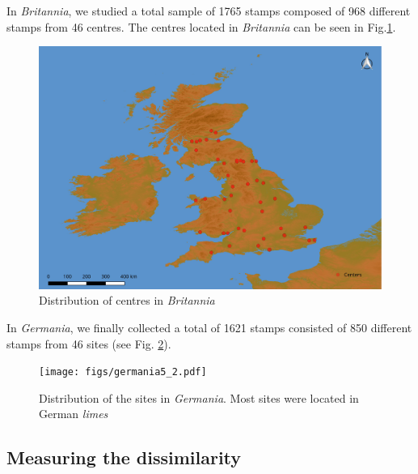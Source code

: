\documentclass[review]{elsarticle}
\newcommand{\memo}[2]{\textcolor{#1}{#2}}
\newcommand{\xavi}[1]{\memo{magenta}{XRC: #1\\}}
\begin{document}
In \textit{Britannia}, we studied a total sample of 1765 stamps composed of 968 different stamps from 46 centres. The centres located in \textit{Britannia} can be seen in Fig.\ref{britannia}.
 
\begin{figure}[htp]
	\centering
\includegraphics[width=\linewidth]{figs/britmap2.pdf}
\caption{Distribution of centres in \textit{Britannia}}
\label{britannia}
\end{figure} 



In \textit{Germania}, we finally collected a total of 1621 stamps consisted of 850 different stamps from 46 sites (see Fig. \ref{germania}). 

 
\begin{figure}[htp]
	\centering
\texttt{[image: figs/germania5\_2.pdf]}
\caption{Distribution of the sites in \textit{Germania}. Most sites were located in German \textit{limes}}
\label{germania}
\end{figure}


\subsection{Measuring the dissimilarity}


\end{document}
